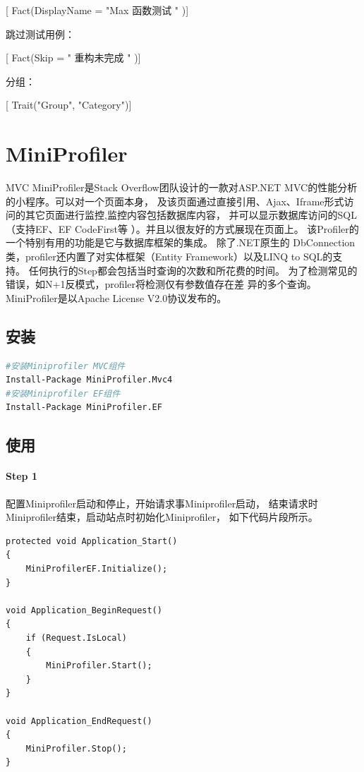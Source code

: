 \documentclass{book}
\begin{document}
[ Fact(DisplayName = "Max 函数测试 " )]

跳过测试用例：

[ Fact(Skip = " 重构未完成 " )]

分组：

[ Trait("Group", "Category")]




\section{MiniProfiler}

MVC MiniProfiler是Stack Overflow团队设计的一款对ASP.NET MVC的性能分析的小程序。可以对一个页面本身，
及该页面通过直接引用、Ajax、Iframe形式访问的其它页面进行监控,监控内容包括数据库内容，
并可以显示数据库访问的SQL（支持EF、EF CodeFirst等 ）。并且以很友好的方式展现在页面上。
该Profiler的一个特别有用的功能是它与数据库框架的集成。
除了.NET原生的 DbConnection类，profiler还内置了对实体框架（Entity Framework）以及LINQ to SQL的支持。
任何执行的Step都会包括当时查询的次数和所花费的时间。
为了检测常见的错误，如N+1反模式，profiler将检测仅有参数值存在差 异的多个查询。
MiniProfiler是以Apache License V2.0协议发布的。


\subsection{安装}

\begin{lstlisting}[language=Bash]
#安装Miniprofiler MVC组件
Install-Package MiniProfiler.Mvc4
#安装Miniprofiler EF组件
Install-Package MiniProfiler.EF
\end{lstlisting}

\subsection{使用}

\paragraph{Step 1}配置Miniprofiler启动和停止，开始请求事Miniprofiler启动，
结束请求时Miniprofiler结束，启动站点时初始化Miniprofiler，
如下代码片段所示。

\begin{lstlisting}[language={[Sharp]C}]
protected void Application_Start()
{    
    MiniProfilerEF.Initialize();
}

void Application_BeginRequest()
{
    if (Request.IsLocal)
    {
        MiniProfiler.Start();
    }
}

void Application_EndRequest()
{
    MiniProfiler.Stop();
}
\end{lstlisting}
\end{document}
